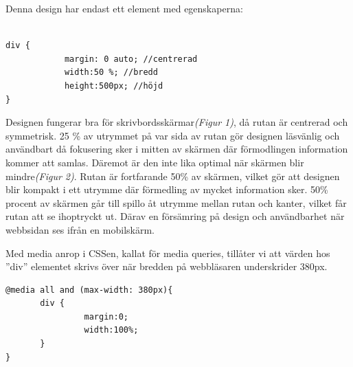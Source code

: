\documentclass[11pt]{article}
\begin{document}
\vspace{1cm}
Denna design har endast ett element med egenskaperna:

\vspace{0.5cm}
\begin{verbatim}

div {	
	        margin: 0 auto; //centrerad
	        width:50 %; //bredd
	        height:500px; //höjd
}

\end{verbatim}

Designen fungerar bra för skrivbordsskärmar\textit{(Figur 1)}, då rutan är centrerad och symmetrisk. 25 \% av utrymmet på var sida av rutan gör designen läsvänlig och användbart då fokusering sker i mitten av skärmen där förmodlingen information kommer att samlas. Däremot är den inte lika optimal när skärmen blir mindre\textit{(Figur 2)}. Rutan är fortfarande 50\% av skärmen, vilket gör att  designen blir kompakt i ett utrymme där förmedling av mycket information sker. 50\% procent av skärmen går till spillo åt utrymme mellan rutan och kanter, vilket får rutan att se ihoptryckt ut. Därav en försämring på design och användbarhet när webbsidan ses ifrån en mobilskärm.

Med media anrop i CSSen, kallat för media queries, tillåter vi att värden hos ”div” elementet skrivs över när bredden på webbläsaren underskrider 380px.

\vspace{0.5cm}
\begin{verbatim}
@media all and (max-width: 380px){
       div {
                margin:0;
                width:100%;
       }
}
\end{verbatim}
\vspace{0.5cm}
\end{document}
